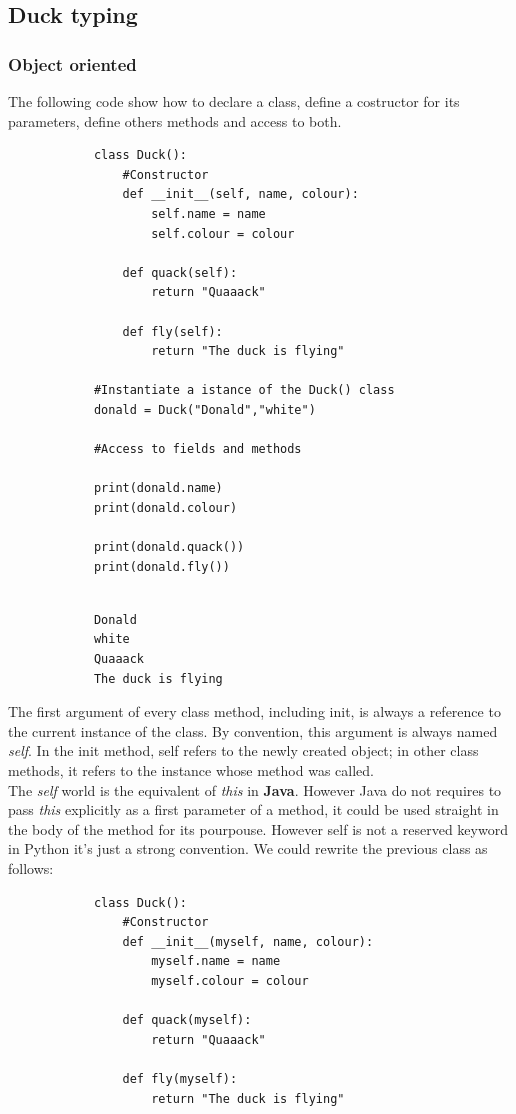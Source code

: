 \documentclass[12pt]{article}
\begin{document}
		
				
	\subsection{Duck typing}
	
		\subsubsection{Object oriented}
		
		The following code show how to declare a class, define a costructor for its parameters, define others methods and access to both.
		
		\begin{lstlisting}
			class Duck():
				#Constructor 
				def __init__(self, name, colour):
					self.name = name
					self.colour = colour
				
				def quack(self):
					return "Quaaack"
				
				def fly(self):
					return "The duck is flying"
			
			#Instantiate a istance of the Duck() class
			donald = Duck("Donald","white")
			
			#Access to fields and methods
			
			print(donald.name)
			print(donald.colour)
			
			print(donald.quack())
			print(donald.fly())
			
		\end{lstlisting}
		
		\begin{lstlisting}
			Donald
			white
			Quaaack
			The duck is flying
		\end{lstlisting}
		
		The first argument of every class method, including init, is always a reference to the current instance of the class. By convention, this argument is always named \textit{self}. In the init method, self refers to the newly created object; in other class methods, it refers to the instance whose method was called. \\
		The \textit{self} world is the equivalent of \textit{this} in \textbf{Java}. However Java do not requires to pass \textit{this} explicitly as a first parameter of a method, it could be used straight in the body of the method for its pourpouse.  	
		However self is not a reserved keyword in Python it’s just a strong convention. We could rewrite the previous class as follows:
		
		\begin{lstlisting}
			class Duck():
				#Constructor 
				def __init__(myself, name, colour):
					myself.name = name
					myself.colour = colour
			
				def quack(myself):
					return "Quaaack"
			
				def fly(myself):
					return "The duck is flying"
		\end{lstlisting}
		
\end{document}
